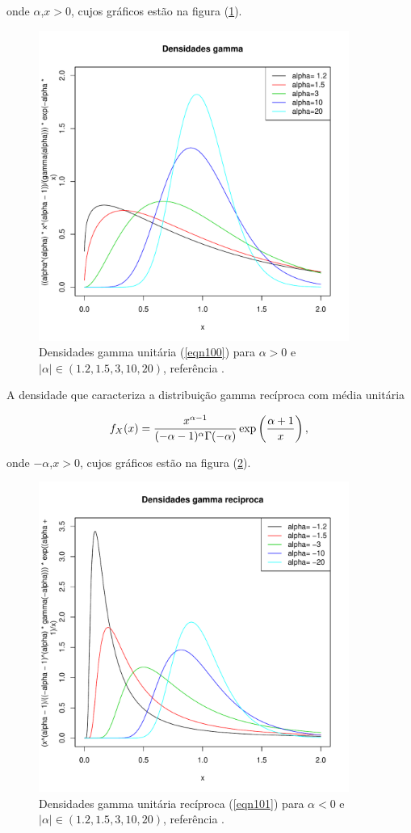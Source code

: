 \documentclass[12pt,a4paper]{article}
\begin{document}
onde $\alpha$,$x>0$, cujos gráficos estão na figura (\ref{fig7}).

\begin{figure}[!htb]
\centering
\includegraphics[width=4.0in]{fig3a_freitas_frery_2005.pdf}
	\caption{Densidades  gamma unitária (\ref{eqn100}) para $\alpha > 0$ e $|\alpha|\in(1.2,1.5,3,10,20)$, referência \cite{freitas_frery_2005} .}
\label{fig7}
\end{figure}


A densidade que caracteriza a distribuição gamma recíproca com média unitária

\begin{equation}\label{eqn101}
	f_{X}(x)=\frac{x^{\alpha-1}}{(-\alpha-1)^{\alpha}\Gamma(-\alpha)}\exp\left(\frac{\alpha+1}{x}\right), \\
\end{equation}

onde $-\alpha$,$x>0$, cujos gráficos estão na figura (\ref{fig8}).

\begin{figure}[!htb]
\centering
\includegraphics[width=4.0in]{fig3b_freitas_frery_2005.pdf}
	\caption{Densidades gamma unitária recíproca (\ref{eqn101}) para $\alpha < 0$ e $|\alpha|\in(1.2,1.5,3,10,20)$, referência \cite{freitas_frery_2005} .}
\label{fig8}
\end{figure}
\end{document}
